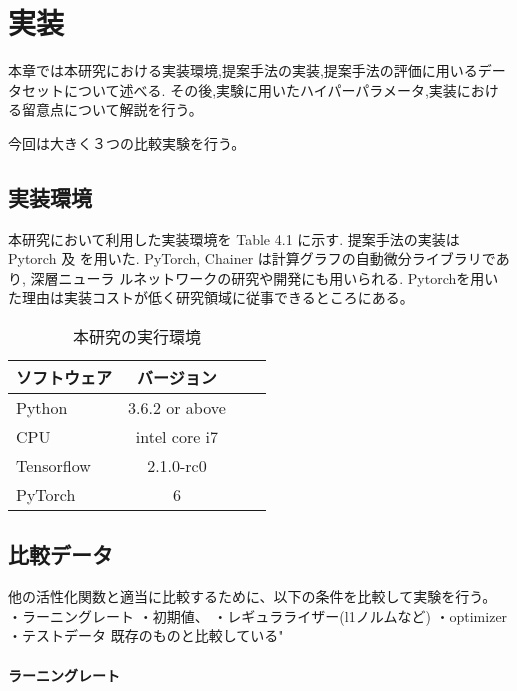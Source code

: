 \chapter{実装}
\label{implementation}

本章では本研究における実装環境,提案手法の実装,提案手法の評価に用いるデータセットについて述べる.
その後,実験に用いたハイパーパラメータ,実装における留意点について解説を行う。

今回は大きく３つの比較実験を行う。



\section{実装環境}



本研究において利用した実装環境を Table 4.1 に示す. 提案手法の実装は Pytorch 及
を用いた.  PyTorch, Chainer は計算グラフの自動微分ライブラリであり, 深層ニューラ
ルネットワークの研究や開発にも用いられる.
Pytorchを用いた理由は実装コストが低く研究領域に従事できるところにある。



\begin{table}[htbp]
    \begin{center}
        \caption{本研究の実行環境}
        \begin{tabular}{l*{2}{c}r}
        ソフトウェア              & バージョン \\
        \hline
        Python            & 3.6.2 or above \\
        CPU               & intel core i7 \\
        Tensorflow        & 2.1.0-rc0 \\
        PyTorch           & 6 \\
        \end{tabular}
    \end{center}
\end{table}



\section{比較データ}

他の活性化関数と適当に比較するために、以下の条件を比較して実験を行う。
・ラーニングレート
・初期値、
・レギュラライザー(l1ノルムなど)
・optimizer
・テストデータ
既存のものと比較している"
\subsubsection{ラーニングレート}

